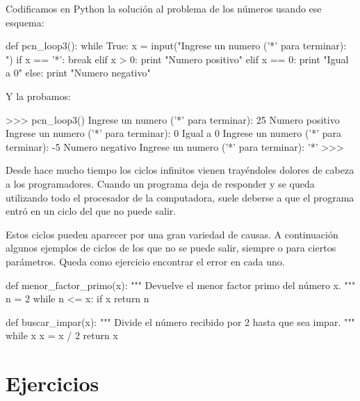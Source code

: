 Codificamos en Python la solución al problema de los números usando ese
esquema:

\begin{codigo-python}
def pcn_loop3():
    while True:
        x = input("Ingrese un numero ('*' para terminar): ")
        if x == '*':
            break
        elif x > 0:
            print "Numero positivo"
        elif x == 0:
            print "Igual a 0"
        else:
            print "Numero negativo"
\end{codigo-python}

Y la probamos:

\begin{codigo-python-sn}
>>> pcn_loop3()
Ingrese un numero ('*' para terminar): 25
Numero positivo
Ingrese un numero ('*' para terminar): 0
Igual a 0
Ingrese un numero ('*' para terminar): -5
Numero negativo
Ingrese un numero ('*' para terminar): '*'
>>>
\end{codigo-python-sn}

\begin{sabias_que}
Desde hace mucho tiempo los ciclos infinitos vienen trayéndoles dolores de
cabeza a los programadores.  Cuando un programa deja de responder y se
queda utilizando todo el procesador de la computadora, suele deberse a que
el programa entró en un ciclo del que no puede salir.

Estos ciclos pueden aparecer por una gran variedad de causas.  A
continuación algunos ejemplos de ciclos de los que no se puede salir,
siempre o para ciertos parámetros.  Queda como ejercicio encontrar el error
en cada uno.

\begin{codigo-python-sn}
def menor_factor_primo(x):
    """ Devuelve el menor factor primo del número x. """
    n = 2
    while n <= x:
        if x %
            return n
\end{codigo-python-sn}

\begin{codigo-python-sn}
def buscar_impar(x):
    """ Divide el número recibido por 2 hasta que sea impar. """
    while x %
        x = x / 2
    return x
\end{codigo-python-sn}
\end{sabias_que}

\section{Ejercicios}


